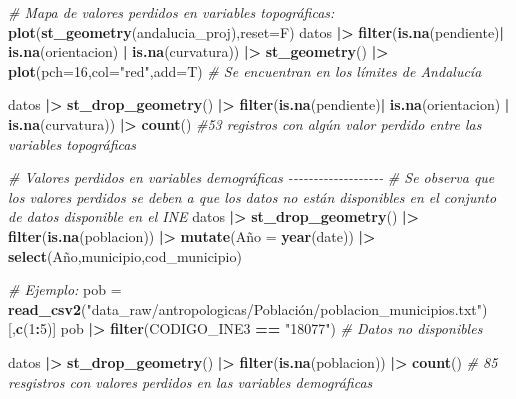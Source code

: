 \documentclass[12pt,a4paper,]{book}
\newenvironment{Shaded}{\begin{snugshade}}{\end{snugshade}}
\newcommand{\AttributeTok}[1]{\textcolor[rgb]{0.13,0.29,0.53}{#1}}
\newcommand{\CommentTok}[1]{\textcolor[rgb]{0.56,0.35,0.01}{\textit{#1}}}
\newcommand{\DecValTok}[1]{\textcolor[rgb]{0.00,0.00,0.81}{#1}}
\newcommand{\FunctionTok}[1]{\textcolor[rgb]{0.13,0.29,0.53}{\textbf{#1}}}
\newcommand{\NormalTok}[1]{#1}
\newcommand{\OtherTok}[1]{\textcolor[rgb]{0.56,0.35,0.01}{#1}}
\newcommand{\SpecialCharTok}[1]{\textcolor[rgb]{0.81,0.36,0.00}{\textbf{#1}}}
\newcommand{\StringTok}[1]{\textcolor[rgb]{0.31,0.60,0.02}{#1}}
\numberwithin{dummy}{section}
\theoremstyle{ocrenumbox}
\theoremstyle{blacknumex}
\theoremstyle{blacknumbox}
\theoremstyle{ocrenum}
\theoremstyle{ocrenum}
\begin{document}
\begin{Shaded}
\begin{Highlighting}[]
\CommentTok{\# Mapa de valores perdidos en variables topográficas:}
\FunctionTok{plot}\NormalTok{(}\FunctionTok{st\_geometry}\NormalTok{(andalucia\_proj),}\AttributeTok{reset=}\NormalTok{F)}
\NormalTok{datos }\SpecialCharTok{|\textgreater{}} 
  \FunctionTok{filter}\NormalTok{(}\FunctionTok{is.na}\NormalTok{(pendiente)}\SpecialCharTok{|} \FunctionTok{is.na}\NormalTok{(orientacion) }\SpecialCharTok{|} \FunctionTok{is.na}\NormalTok{(curvatura)) }\SpecialCharTok{|\textgreater{}} 
  \FunctionTok{st\_geometry}\NormalTok{() }\SpecialCharTok{|\textgreater{}} 
  \FunctionTok{plot}\NormalTok{(}\AttributeTok{pch=}\DecValTok{16}\NormalTok{,}\AttributeTok{col=}\StringTok{"red"}\NormalTok{,}\AttributeTok{add=}\NormalTok{T) }\CommentTok{\# Se encuentran en los límites de Andalucía}

\NormalTok{datos }\SpecialCharTok{|\textgreater{}} 
  \FunctionTok{st\_drop\_geometry}\NormalTok{() }\SpecialCharTok{|\textgreater{}} 
  \FunctionTok{filter}\NormalTok{(}\FunctionTok{is.na}\NormalTok{(pendiente)}\SpecialCharTok{|} \FunctionTok{is.na}\NormalTok{(orientacion) }\SpecialCharTok{|} \FunctionTok{is.na}\NormalTok{(curvatura)) }\SpecialCharTok{|\textgreater{}} 
  \FunctionTok{count}\NormalTok{() }\CommentTok{\#53 registros con algún valor perdido entre las variables topográficas}


\CommentTok{\# Valores perdidos en variables demográficas {-}{-}{-}{-}{-}{-}{-}{-}{-}{-}{-}{-}{-}{-}{-}{-}{-}{-}{-}}
\CommentTok{\# Se observa que los valores perdidos se deben a que los datos no están disponibles en el conjunto de datos disponible en el INE}
\NormalTok{datos }\SpecialCharTok{|\textgreater{}} 
  \FunctionTok{st\_drop\_geometry}\NormalTok{() }\SpecialCharTok{|\textgreater{}} 
  \FunctionTok{filter}\NormalTok{(}\FunctionTok{is.na}\NormalTok{(poblacion)) }\SpecialCharTok{|\textgreater{}} 
  \FunctionTok{mutate}\NormalTok{(Año }\OtherTok{=} \FunctionTok{year}\NormalTok{(date)) }\SpecialCharTok{|\textgreater{}} 
  \FunctionTok{select}\NormalTok{(Año,municipio,cod\_municipio)}

\CommentTok{\# Ejemplo:}
\NormalTok{pob }\OtherTok{=} \FunctionTok{read\_csv2}\NormalTok{(}\StringTok{"data\_raw/antropologicas/Población/poblacion\_municipios.txt"}\NormalTok{)[,}\FunctionTok{c}\NormalTok{(}\DecValTok{1}\SpecialCharTok{:}\DecValTok{5}\NormalTok{)] }
\NormalTok{pob }\SpecialCharTok{|\textgreater{}} \FunctionTok{filter}\NormalTok{(CODIGO\_INE3 }\SpecialCharTok{==} \StringTok{"18077"}\NormalTok{) }\CommentTok{\# Datos no disponibles}

\NormalTok{datos }\SpecialCharTok{|\textgreater{}} 
  \FunctionTok{st\_drop\_geometry}\NormalTok{() }\SpecialCharTok{|\textgreater{}} 
  \FunctionTok{filter}\NormalTok{(}\FunctionTok{is.na}\NormalTok{(poblacion)) }\SpecialCharTok{|\textgreater{}} 
  \FunctionTok{count}\NormalTok{() }\CommentTok{\# 85 resgistros con valores perdidos en las variables demográficas}


\end{Highlighting}
\end{Shaded}
\end{document}
